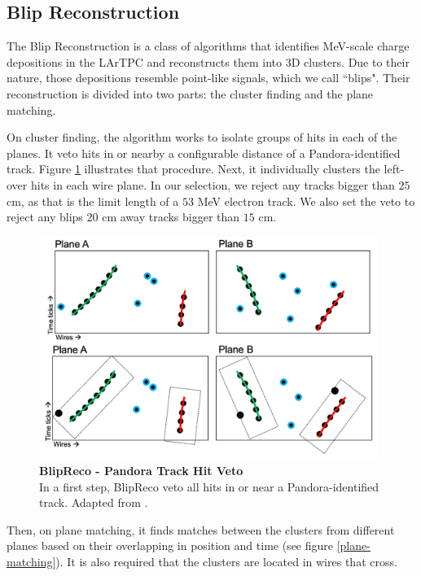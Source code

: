 \subsection{Blip Reconstruction}
The Blip Reconstruction is a class of algorithms that identifies MeV-scale charge depositions in the LArTPC and reconstructs them into 3D clusters. Due to their nature, those depositions resemble point-like signals, which we call ``blips". Their reconstruction is divided into two parts: the cluster finding and the plane matching. 

On cluster finding, the algorithm works to isolate groups of hits in each of the planes. It veto hits in or nearby a configurable distance of a Pandora-identified track. Figure \ref{blip_track_veto} illustrates that procedure. Next, it individually clusters the left-over hits in each wire plane. In our selection, we reject any tracks bigger than $25$ cm, as that is the limit length of a $53$ MeV electron track. We also set the veto to reject any blips $20$ cm away tracks bigger than $15$ cm. 

\begin{figure}[h!]
    \centering
    \includegraphics[width=110mm]{Figures/blip_track_veto.png}
    \caption[BlipReco - Pandora Track Hit Veto]{{\textbf{BlipReco - Pandora Track Hit Veto}}\\ In a first step, BlipReco veto all hits in or near a Pandora-identified track. Adapted from \cite{will_CM_Aug}.}
    \label{blip_track_veto}
\end{figure}

Then, on plane matching, it finds matches between the clusters from different planes based on their overlapping in position and time (see figure \ref{plane-matching}). It is also required that the clusters are located in wires that cross. 

